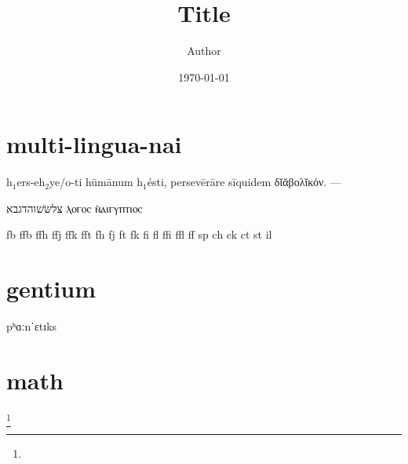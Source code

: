 \documentclass[twoside, 12pt, dvipdfmx]{article}
\title{Title}
\author{Author}
\date{\today}
\begin{document}
    \maketitle
    \tableofcontents
    \newpage

    \section{multi-lingua-nai}
    \label{sect1}

    h$_1$ers-eh$_2$ye/o-ti hūmānum h$_1$ésti, persevērāre sīquidem δῐᾰβολῐκόν. ---


    צּלּשּׂשׁוהדגבא
    ⲗⲟⲅⲟⲥ ⲛ̀ⲁⲓⲅⲩⲡⲧⲓⲟⲥ

    fb ffb ffh ffj ffk fft fh fj ft fk fi fl ffi ffl ff sp ch ck ct st il

    \section{gentium}
    \label{sec2}
    pʰɑːnˈɛtɪks

    



    \section{math}      \label{sec3}
        \footnote{}
\end{document}
